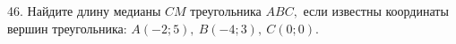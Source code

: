 46. Найдите длину медианы $CM$ треугольника $ABC,$ если известны координаты вершин треугольника: $A(-2;5),\ B(-4;3),\ C(0;0).$\\
